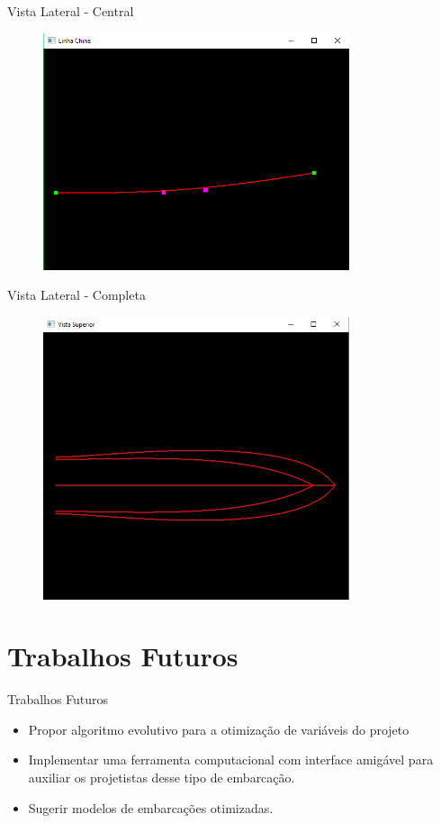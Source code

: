 \documentclass{beamer}
\begin{document}
\begin{frame}{Vista Lateral - Central}
\begin{figure}[h]	
\centering
\includegraphics[width=9cm]{linhachine}
\end{figure}
\end{frame}
\begin{frame}{Vista Lateral - Completa}
\begin{figure}[h]	
\centering
\includegraphics[width=9cm]{superioropengl}
\end{figure}
\end{frame}

\section{Trabalhos Futuros}
\begin{frame}
\tableofcontents[ 
    currentsubsection, 
    hideothersubsections, 
    sectionstyle=show/shaded
    ] 
\end{frame}
\begin{frame}{Trabalhos Futuros}
\begin{itemize}
	\item Propor algoritmo evolutivo para a otimização de variáveis do projeto
	\item Implementar uma ferramenta computacional com interface amigável para auxiliar os projetistas desse tipo de embarcação.
	\item Sugerir modelos de embarcações otimizadas.
\end{itemize}

\end{frame}
\end{document}
